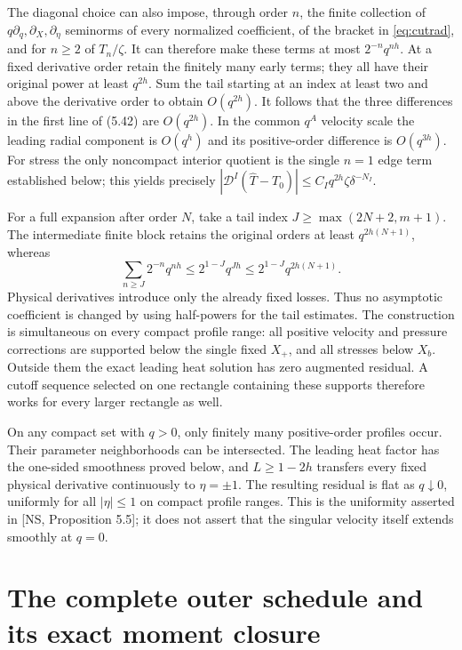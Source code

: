 \documentclass[10pt,a4paper]{article}
\newcommand{\D}{\mathcal D}
\begin{document}
The diagonal choice can also impose, through order $n$, the finite collection
of $q\partial_q,\partial_X,\partial_\eta$ seminorms of every normalized
coefficient, of the bracket in \eqref{eq:cutrad}, and for $n\ge2$ of $T_n/\zeta$.
It can therefore make these terms at most $2^{-n}q^{nh}$.
At a fixed derivative order retain the finitely many early terms; they all
have their original power at least $q^{2h}$. Sum the tail starting at an index
at least two and above the derivative order to obtain $O(q^{2h})$.
It follows that the three differences in the first line of (5.42) are
$O(q^{2h})$. In the common $q^A$ velocity scale the leading radial component
is $O(q^h)$ and its positive-order difference is $O(q^{3h})$.
For stress the only noncompact interior quotient is the single $n=1$ edge
term established below; this yields precisely
$|\D^I(\widehat T-T_0)|\le C_Iq^{2h}\zeta\delta^{-N_I}$.

For a full expansion after order $N$, take a tail index
$J\ge\max(2N+2,m+1)$. The intermediate finite block retains the original
orders at least $q^{2h(N+1)}$, whereas
\[
\sum_{n\ge J}2^{-n}q^{nh}\le2^{1-J}q^{Jh}
\le2^{1-J}q^{2h(N+1)}.
\]
Physical derivatives introduce only the already fixed losses. Thus no
asymptotic coefficient is changed by using half-powers for the tail estimates.
The construction is simultaneous on every compact profile range: all positive
velocity and pressure corrections are supported below the single fixed $X_+$,
and all stresses below $X_b$. Outside them the exact leading heat solution has
zero augmented residual. A cutoff sequence selected on one rectangle containing
these supports therefore works for every larger rectangle as well.

On any compact set with $q>0$, only finitely many positive-order profiles occur.
Their parameter neighborhoods can be intersected. The leading heat factor has
the one-sided smoothness proved below, and $L\ge1-2h$ transfers every fixed
physical derivative continuously to $\eta=\pm1$. The resulting residual is
flat as $q\downarrow0$, uniformly for all $|\eta|\le1$ on compact profile
ranges. This is the uniformity asserted in [NS, Proposition 5.5]; it does not
assert that the singular velocity itself extends smoothly at $q=0$.

\section{The complete outer schedule and its exact moment closure}
\end{document}
